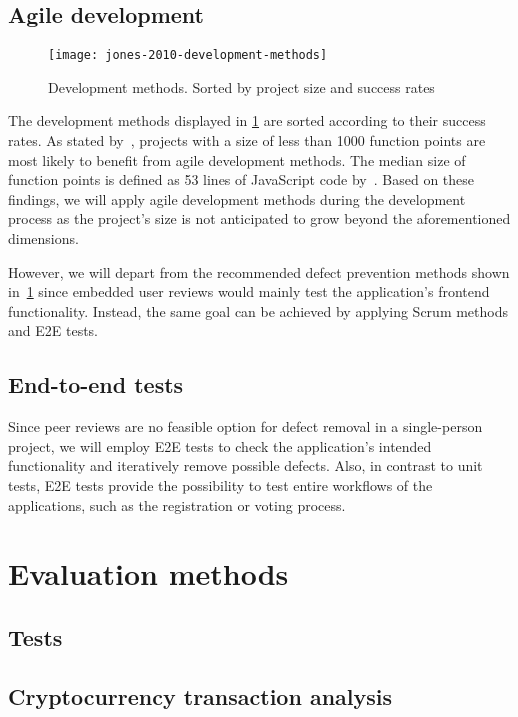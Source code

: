 \subsection{Agile development}\label{subsec:agile-development}

\begin{figure}
    \centering
    \texttt{[image: jones-2010-development-methods]}
    \caption[Development mehtods]{Development methods. Sorted by project size and success rates~\autocite[11]{jones_software_2010}}
    \label{fig:development-methods}
\end{figure}

The development methods displayed in \cref{fig:development-methods} are sorted according to their success rates.
As stated by~\textcite[10-12]{jones_software_2010}, projects with a size of less than 1000 function points are most likely to benefit from agile development methods.
The median size of function points is defined as 53 lines of JavaScript code by~\textcite{qsm_function_2009}.
Based on these findings, we will apply agile development methods during the development process as the project's size is not anticipated to grow beyond the aforementioned dimensions.

However, we will depart from the recommended defect prevention methods shown in~\cref{fig:development-methods} since embedded user reviews would mainly test the application’s frontend functionality.
Instead, the same goal can be achieved by applying Scrum methods and \gls{E2E} tests.

\subsection{End-to-end tests}\label{subsec:end-to-end-tests}

Since peer reviews are no feasible option for defect removal in a single-person project, we will employ E2E tests to check the application’s intended functionality and iteratively remove possible defects.
Also, in contrast to unit tests, \gls{E2E} tests provide the possibility to test entire workflows of the applications, such as the registration or voting process.

\section{Evaluation methods}\label{sec:evaluation-methods}

\subsection{Tests}\label{subsec:tests}
\subsection{Cryptocurrency transaction analysis}\label{subsec:crypto-currency-transaction-analysis}
